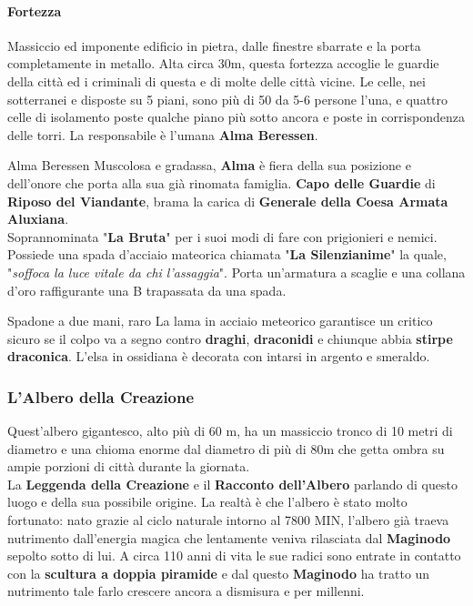 \documentclass[10pt,twoside,onecolumn,openany]{book}
\begin{document}
\paragraph{Fortezza} Massiccio ed imponente edificio in pietra, dalle finestre sbarrate e la porta completamente in metallo. Alta circa 30m, questa fortezza accoglie le guardie della città ed i criminali di questa e di molte delle città vicine. Le celle, nei sotterranei e disposte su 5 piani, sono più di 50 da 5-6 persone l'una, e quattro celle di isolamento poste qualche piano più sotto ancora e poste in corrispondenza delle torri. La responsabile è l'umana \textbf{Alma Beressen}.
\begin{multicols}{2}
\begin{paperbox}{{Alma Beressen}}
Muscolosa e gradassa, \textbf{Alma} è fiera della sua posizione e dell'onore che porta alla sua già rinomata famiglia. \textbf{Capo delle Guardie} di \textbf{Riposo del Viandante}, brama la carica di \textbf{Generale della Coesa Armata Aluxiana}.\\
Soprannominata "\textbf{La Bruta}" per i suoi modi di fare con prigionieri e nemici.
Possiede una spada d'acciaio mateorica chiamata "\textbf{La Silenzianime}" la quale, "\textit{soffoca la luce vitale da chi l'assaggia}". Porta un'armatura a scaglie e una collana d'oro raffigurante una B trapassata da una spada.
\end{paperbox}
{Spadone a due mani, raro}
La lama in acciaio meteorico garantisce un critico sicuro se il colpo va a segno contro \textbf{draghi}, \textbf{draconidi} e chiunque abbia \textbf{stirpe draconica}. L'elsa in ossidiana è decorata con intarsi in argento e smeraldo.
\end{multicols}
\newpage
\subsubsection{L'Albero della Creazione}
Quest'albero gigantesco, alto più di 60 m, ha un massiccio tronco di 10 metri di diametro e una chioma enorme dal diametro di più di 80m che getta ombra su ampie porzioni di città durante la giornata.\\
La \textbf{Leggenda della Creazione} e il \textbf{Racconto dell'Albero} parlando di questo luogo e della sua possibile origine. La realtà è che l'albero è stato molto fortunato: nato  grazie al ciclo naturale intorno al 7800 MIN, l'albero già traeva nutrimento dall'energia magica che lentamente veniva rilasciata dal \textbf{Maginodo} sepolto sotto di lui. A circa 110 anni di vita le sue radici sono entrate in contatto con la \textbf{scultura a doppia piramide} e dal questo \textbf{Maginodo} ha tratto un nutrimento tale farlo crescere ancora a dismisura e per millenni.
\end{document}
